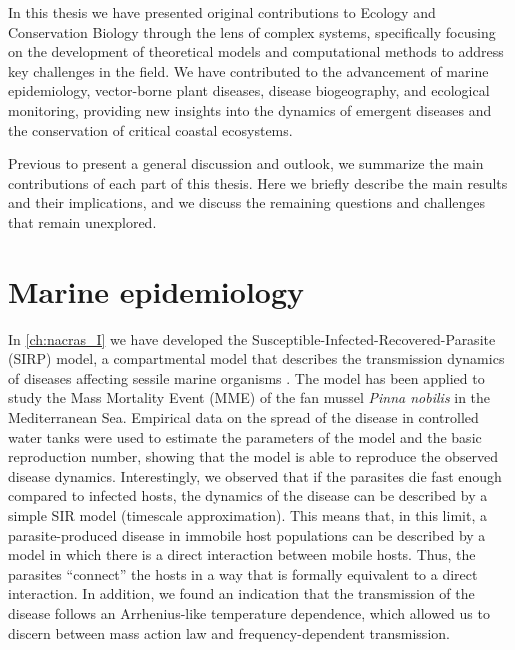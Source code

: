 
In this thesis we have presented original contributions to Ecology
and Conservation Biology through the lens of complex systems, specifically
focusing on the development of theoretical models and computational
methods to address key challenges in the field. We have contributed to the
advancement of marine epidemiology, vector-borne plant diseases, disease
biogeography, and ecological monitoring, providing new insights into the
dynamics of emergent diseases and the conservation of critical coastal
ecosystems.

Previous to present a general discussion and outlook, we summarize the main
contributions of each part of this thesis. Here we briefly describe the main
results and their implications, and we discuss the remaining questions and
challenges that remain unexplored.

\section{Marine epidemiology}

In \cref{ch:nacras_I} we have developed the
Susceptible-Infected-Recovered-Parasite (SIRP) model, a compartmental model
that describes the transmission dynamics of diseases affecting sessile marine
organisms \cite{GimenezRomero2021}. The model has been applied to
study the Mass Mortality Event (MME) of the fan mussel \textit{Pinna nobilis}
in the Mediterranean Sea. Empirical data on the spread of the disease in
controlled water tanks were used to estimate the parameters of the model and
the basic reproduction number, showing that the model is able to reproduce the
observed disease dynamics. Interestingly, we observed that if the parasites
die fast enough compared to infected hosts, the dynamics of the disease can
be described by a simple SIR model (timescale approximation). This means that,
in this limit, a parasite-produced disease in immobile host populations can be
described by a model in which there is a direct interaction between mobile
hosts. Thus, the parasites ``connect'' the hosts in a way that is formally
equivalent to a direct interaction. In addition, we found an indication that
the transmission of the disease follows an Arrhenius-like temperature
dependence, which allowed us to discern between mass action law and
frequency-dependent transmission.

